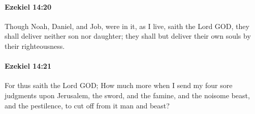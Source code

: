 		\paragraph{Ezekiel 14:20} %
			\label{EZEKIEL-14-20}

			Though Noah, Daniel, and Job, were in it, as I live, saith the Lord GOD, they shall deliver neither son nor daughter; they shall but deliver their own souls by their righteousness.


		\paragraph{Ezekiel 14:21} %
			\label{EZEKIEL-14-21}

			For thus saith the Lord GOD; How much more when I send my four sore judgments upon Jerusalem, the sword, and the famine, and the noisome beast, and the pestilence, to cut off from it man and beast?


